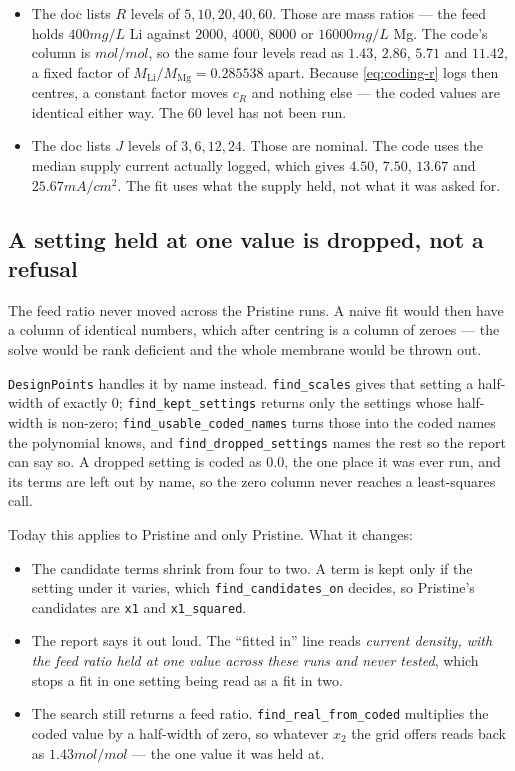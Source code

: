 \begin{itemize}[nosep]
  \item The doc lists $R$ levels of $5, 10, 20, 40, 60$. Those are mass ratios --- the feed
        holds $400\unit{mg/L}$ Li against $2000$, $4000$, $8000$ or $16000\unit{mg/L}$ Mg. The
        code's column is $\unit{mol/mol}$, so the same four levels read as $1.43$, $2.86$,
        $5.71$ and $11.42$, a fixed factor of $M_{\mathrm{Li}}/M_{\mathrm{Mg}} = 0.285538$ apart.
        Because \eqref{eq:coding-r} logs then centres, a constant factor moves $c_R$ and nothing
        else --- the coded values are identical either way. The $60$ level has not been run.
  \item The doc lists $J$ levels of $3, 6, 12, 24$. Those are nominal. The code uses the median
        supply current actually logged, which gives $4.50$, $7.50$, $13.67$ and
        $25.67\unit{mA/cm^2}$. The fit uses what the supply held, not what it was asked for.
\end{itemize}

\subsection{A setting held at one value is dropped, not a refusal}

The feed ratio never moved across the Pristine runs. A naive fit would then have a column of
identical numbers, which after centring is a column of zeroes --- the solve would be rank
deficient and the whole membrane would be thrown out.

\texttt{DesignPoints} handles it by name instead. \texttt{find\_scales} gives that setting a
half-width of exactly $0$; \texttt{find\_kept\_settings} returns only the settings whose
half-width is non-zero; \texttt{find\_usable\_coded\_names} turns those into the coded names the
polynomial knows, and \texttt{find\_dropped\_settings} names the rest so the report can say so.
A dropped setting is coded as $0.0$, the one place it was ever run, and its terms are left out by
name, so the zero column never reaches a least-squares call.

Today this applies to Pristine and only Pristine. What it changes:

\begin{itemize}[nosep]
  \item The candidate terms shrink from four to two. A term is kept only if the setting
        under it varies, which \texttt{find\_candidates\_on} decides, so Pristine's
        candidates are \texttt{x1} and \texttt{x1\_squared}.
  \item The report says it out loud. The ``fitted in'' line reads \emph{current density, with
        the feed ratio held at one value across these runs and never tested}, which stops a fit
        in one setting being read as a fit in two.
  \item The search still returns a feed ratio. \texttt{find\_real\_from\_coded} multiplies the
        coded value by a half-width of zero, so whatever $x_2$ the grid offers reads back as
        $1.43\unit{mol/mol}$ --- the one value it was held at.
\end{itemize}

